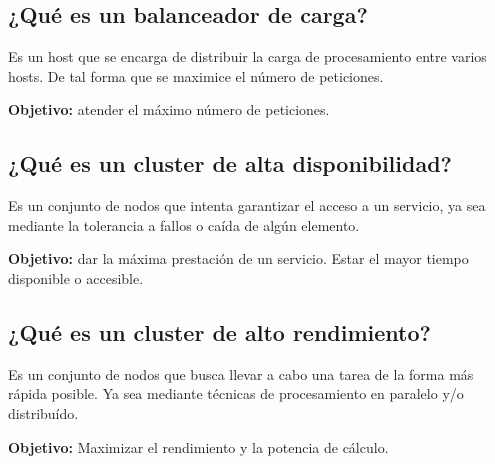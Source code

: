 \documentclass[11pt]{article}
\begin{document}
\subsection{¿Qué es un balanceador de carga?}
\label{sec:orgdc136c2}
Es un host que se encarga de distribuir la carga de procesamiento entre varios hosts. De tal forma que se maximice el número de peticiones.

\textbf{Objetivo:} atender el máximo número de peticiones.
\subsection{¿Qué es un cluster de alta disponibilidad?}
\label{sec:org6188c86}
Es un conjunto de nodos que intenta garantizar el acceso a un servicio, ya sea mediante la tolerancia a fallos o caída de algún elemento.

\textbf{Objetivo:} dar la máxima prestación de un servicio. Estar el mayor tiempo disponible o accesible.
\subsection{¿Qué es un cluster de alto rendimiento?}
\label{sec:org11f1a9c}
Es un conjunto de nodos que busca llevar a cabo una tarea de la forma más rápida posible. Ya sea mediante técnicas de procesamiento en paralelo y/o distribuído.

\textbf{Objetivo:} Maximizar el rendimiento y la potencia de cálculo.
\end{document}
